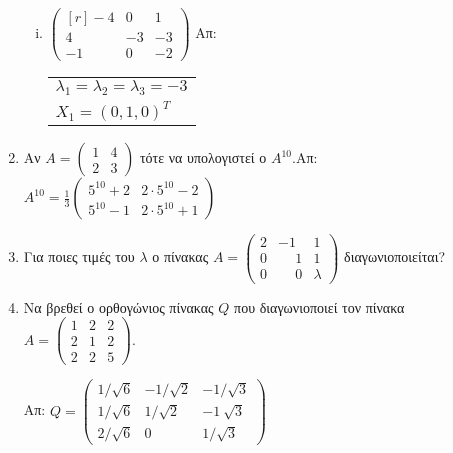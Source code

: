 \begin{enumerate}
\begin{enumerate}[i)]
\item $ \begin{pmatrix*}[r]
		-4 & 0  & 1 \\
		4 & -3 & -3 \\
		-1 & 0 & -2 
\end{pmatrix*}$ \hfill Απ: \begin{tabular}{l}
$ \lambda_{1} = \lambda_{2} = \lambda_{3} = -3 $ \\
$ X_{1} = (0,1,0)^{T} $
\end{tabular}

\end{enumerate}

\item Αν $A=\begin{pmatrix}
1 & 4 \\
2 & 3 
\end{pmatrix}$ τότε να υπολογιστεί ο $A^{10}$.\hfill Απ: $A^{10}=\frac{1}{3}\begin{pmatrix}
5^{10}+2 & 2\cdot 5^{10}-2 \\
5^{10}-1 & 2\cdot 5^{10}+1
\end{pmatrix}$

\item Για ποιες τιμές του $\lambda$ ο πίνακας $A=\begin{pmatrix}
2 & -1 & 1 \\
0 & \phantom{-}1 & 1 \\
0 & \phantom{-}0 & \lambda
\end{pmatrix}$
διαγωνιοποιείται?

\item Να βρεθεί ο ορθογώνιος πίνακας $Q$ που διαγωνιοποιεί τον πίνακα
	$A = \begin{pmatrix*}
		1 & 2 & 2 \\
		2 & 1 & 2 \\
		2 & 2 & 5 
	\end{pmatrix*}.$
	
	\hfill Απ: $ Q = \begin{pmatrix*}
		1/ \sqrt{6} & -1/ \sqrt{2} & -1/ \sqrt{3}	\\
		1/ \sqrt{6} & 1/ \sqrt{2} & -1\ \sqrt{3} \\
		2/ \sqrt{6} & 0 & 1/ \sqrt{3} 
	\end{pmatrix*} $

\end{enumerate}




